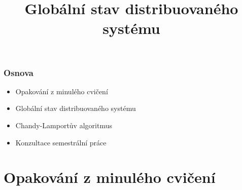 \documentclass[usenames,dvipsnames,9pt]{beamer}
\title{Globální stav distribuovaného systému}
\date{}
\institute{B4B36PDV -- Paralelní a distribuované výpočty}
\begin{document}
\maketitle

\begin{frame}
  \frametitle{Osnova}
  \begin{itemize}
   \item Opakování z minulého cvičení\\[1.5em]
    \item Globální stav distribuovaného systému
    \item Chandy-Lamportův algoritmus\\[1.5em]
    \item Konzultace semestrální práce
  \end{itemize}
\end{frame}

\section{Opakování z minulého cvičení}
\end{document}
